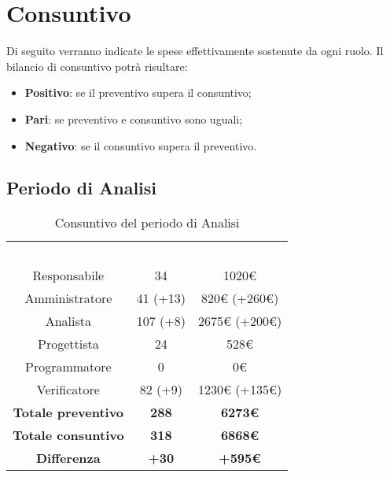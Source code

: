 \section{Consuntivo}
Di seguito verranno indicate le spese effettivamente sostenute da ogni ruolo. Il bilancio di consuntivo potrà risultare: \begin{itemize}
\item \textbf{Positivo}: se il preventivo supera il consuntivo;
\item \textbf{Pari}: se preventivo e consuntivo sono uguali;
\item \textbf{Negativo}: se il consuntivo supera il preventivo.
\end{itemize}

\subsection{Periodo di Analisi}
\begin{table}[H]
\centering\renewcommand{\arraystretch}{1.5}
\caption{Consuntivo del periodo di Analisi}
\vspace{0.2cm}
\begin{tabular}{ c c c }
\rowcolor{redafk}
\textcolor{white}{\textbf{Ruolo}} & \textcolor{white}{\textbf{Ore}} & 
\textcolor{white}{\textbf{Costo}}  \\
Responsabile & 34 & 1020€ \\
Amministratore & 41 (+13) & 820€ (+260€) \\
Analista & 107 (+8) & 2675€ (+200€) \\
Progettista	& 24 & 528€  \\
Programmatore & 0 & 0€  \\
Verificatore & 82 (+9) & 1230€ (+135€)  \\
\textbf{Totale preventivo} & \textbf{288} & \textbf{6273€}  \\
\textbf{Totale consuntivo} & \textbf{318} & \textbf{6868€}  \\
\rowcolor{lastrowcolor}
\textbf{Differenza} & \textbf{+30} & \textbf{+595€}  \\
\end{tabular}
\end{table}

